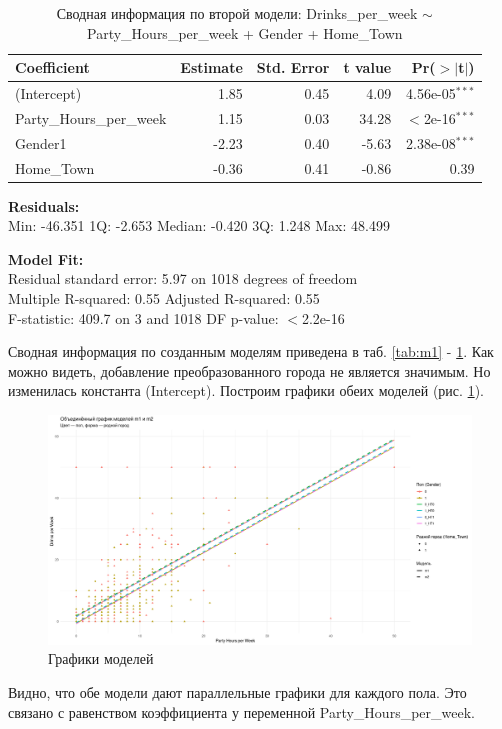 \begin{table}[h]
	\centering
	\caption{Сводная информация по второй модели: Drinks\_per\_week $\sim$ Party\_Hours\_per\_week + Gender + Home\_Town}
	\begin{tabular}{lrrrr}
		\hline
		\textbf{Coefficient} & \textbf{Estimate} & \textbf{Std. Error} & \textbf{t value} & \textbf{Pr($>$$|$t$|$)} \\
		\hline
		(Intercept)             & 1.85 & 0.45 & 4.09  & 4.56e-05$^{***}$ \\
		Party\_Hours\_per\_week & 1.15 & 0.03 & 34.28 & $<$2e-16$^{***}$ \\
		Gender1                 & -2.23 & 0.40 & -5.63 & 2.38e-08$^{***}$ \\
		Home\_Town              & -0.36 & 0.41 & -0.86 & 0.39 \\
		\hline
	\end{tabular}
	
	\vspace{0.5em}
	\textbf{Residuals:}\\
	Min: -46.351 \quad 1Q: -2.653 \quad Median: -0.420 \quad 3Q: 1.248 \quad Max: 48.499
	
	\vspace{0.5em}
	\textbf{Model Fit:}\\
	Residual standard error: 5.97 on 1018 degrees of freedom \\
	Multiple R-squared: 0.55 \quad Adjusted R-squared: 0.55 \\
	F-statistic: 409.7 on 3 and 1018 DF \quad p-value: $<$2.2e-16
	\label{tab:m2}
\end{table}

Сводная информация по созданным моделям приведена в таб. \ref{tab:m1} - \ref{tab:m2}.
Как можно видеть, добавление преобразованного города не является значимым. Но изменилась константа (Intercept).
\newpage
Построим графики обеих моделей (рис. \ref{fig:models}).
\begin{figure}[h]  %
	\centering
	\includegraphics[height=0.6\textwidth]{imgs/models.png}  %
	\caption{Графики моделей}  %
	\label{fig:models}  %
\end{figure}
Видно, что обе модели дают параллельные графики для каждого пола. Это связано с равенством коэффициента у переменной  Party\_Hours\_per\_week.
\newpage

